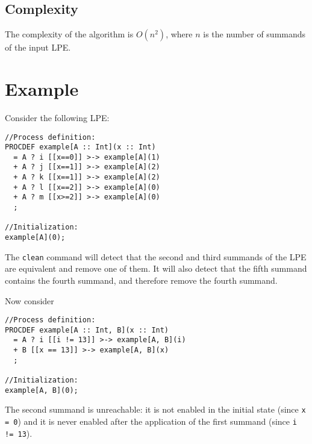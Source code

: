 \subsection{Complexity}

The complexity of the algorithm is $O(n^2)$, where $n$ is the number of summands of the input LPE.

\section{Example}

Consider the following LPE:

\begin{lstlisting}
//Process definition:
PROCDEF example[A :: Int](x :: Int)
  = A ? i [[x==0]] >-> example[A](1)
  + A ? j [[x==1]] >-> example[A](2)
  + A ? k [[x==1]] >-> example[A](2)
  + A ? l [[x==2]] >-> example[A](0)
  + A ? m [[x>=2]] >-> example[A](0)
  ;

//Initialization:
example[A](0);
\end{lstlisting}

The \texttt{clean} command will detect that the second and third summands of the LPE are equivalent and remove one of them.
It will also detect that the fifth summand contains the fourth summand, and therefore remove the fourth summand.

Now consider

\begin{lstlisting}
//Process definition:
PROCDEF example[A :: Int, B](x :: Int)
  = A ? i [[i != 13]] >-> example[A, B](i)
  + B [[x == 13]] >-> example[A, B](x)
  ;

//Initialization:
example[A, B](0);
\end{lstlisting}

The second summand is unreachable: it is not enabled in the initial state (since \texttt{x = 0}) and it is never enabled after the application of the first summand (since \texttt{i != 13}).

